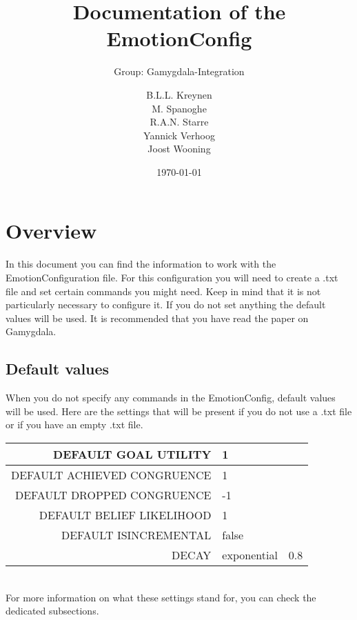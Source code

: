\documentclass{scrartcl}
\begin{document}
\title{Documentation of the EmotionConfig}
\subtitle{Group: Gamygdala-Integration}
\date{\today{}}

\author{
    \begin{tabular}{l r}
      B.L.L. Kreynen\\
      M. Spanoghe\\
      R.A.N. Starre\\
      Yannick Verhoog\\
      Joost Wooning\\
    \end{tabular}
}

\maketitle \thispagestyle{empty} \pagebreak
\pagebreak
\tableofcontents
\pagebreak

\section{Overview}
In this document you can find the information to work with the EmotionConfiguration file. For this configuration you will need to create a .txt file and set certain commands you might need. Keep in mind that it is not particularly necessary to configure it. If you do not set anything the default values will be used. It is recommended that you have read the paper on Gamygdala\cite{Gamygdala}. 

\subsection{Default values}
When you do not specify any commands in the EmotionConfig, default values will be used. Here are the settings that will be present if you do not use a .txt file or if you have an empty .txt file.\\
\begin{tabular}{|r|l| l|}
\hline  DEFAULT GOAL UTILITY & 1 & \\ 
\hline  DEFAULT ACHIEVED CONGRUENCE & 1 & \\ 
\hline  DEFAULT DROPPED CONGRUENCE & -1 &  \\ 
\hline  DEFAULT BELIEF LIKELIHOOD& 1 &  \\ 
\hline  DEFAULT ISINCREMENTAL & false &  \\
\hline  DECAY & exponential & 0.8 \\
\hline
\end{tabular}
\\
For more information on what these settings stand for, you can check the dedicated subsections.
\end{document}
